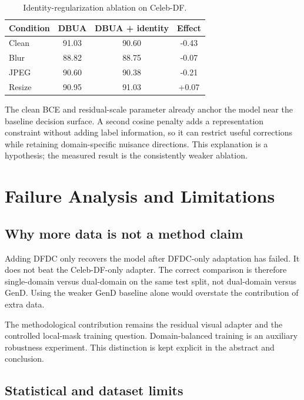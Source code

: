\documentclass[10pt,twocolumn]{article}
\begin{document}
\begin{table}[t]
  \centering
  \caption{Identity-regularization ablation on Celeb-DF.}
  \label{tab:identity}
  \small
  \begin{tabular}{@{}lccc@{}}
    \toprule
    Condition & DBUA & DBUA + identity & Effect \\
    \midrule
    Clean  & 91.03 & 90.60 & -0.43 \\
    Blur   & 88.82 & 88.75 & -0.07 \\
    JPEG   & 90.60 & 90.38 & -0.21 \\
    Resize & 90.95 & 91.03 & +0.07 \\
    \bottomrule
  \end{tabular}
\end{table}

The clean BCE and residual-scale parameter already anchor the model near the
baseline decision surface. A second cosine penalty adds a representation
constraint without adding label information, so it can restrict useful
corrections while retaining domain-specific nuisance directions. This
explanation is a hypothesis; the measured result is the consistently weaker
ablation.

\section{Failure Analysis and Limitations}

\subsection{Why more data is not a method claim}

Adding DFDC only recovers the model after DFDC-only adaptation has failed. It
does not beat the Celeb-DF-only adapter. The correct comparison is therefore
single-domain versus dual-domain on the same test split, not dual-domain versus
GenD. Using the weaker GenD baseline alone would overstate the contribution of
extra data.

The methodological contribution remains the residual visual adapter and the
controlled local-mask training question. Domain-balanced training is an
auxiliary robustness experiment. This distinction is kept explicit in the
abstract and conclusion.

\subsection{Statistical and dataset limits}
\end{document}
